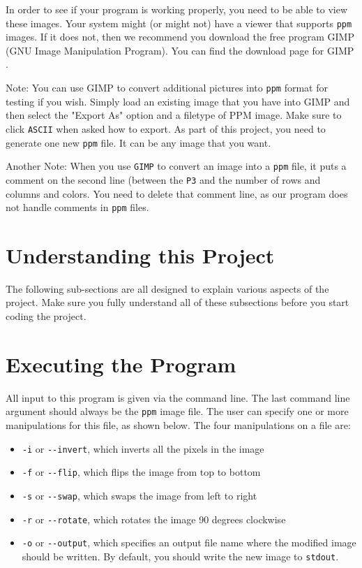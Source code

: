 \documentclass[12pt]{article}
\begin{document}
In order to see if your program is working properly,
you need to be able to view these images.  Your system might (or might not)
have a viewer that supports {\tt ppm} images.  If it does not, then we
recommend you download the free program GIMP (GNU Image Manipulation Program).
You can find the download page for GIMP 
.

Note: You can use GIMP to convert additional pictures into {\tt ppm} format
for testing if you wish.  Simply load an existing image that you have into
GIMP and then select the "Export As" option and a filetype of PPM image.  Make
sure to click {\tt ASCII} when asked how to export.  As part of this project,
you need to generate one new {\tt ppm} file.  It can be any image that you want.

Another Note:  When you use {\tt GIMP} to convert an image into
a {\tt ppm} file, it puts
a comment on the second line (between the {\tt P3} and the number of rows and
columns and colors.  You need to delete that comment line, as our program
does not handle comments in {\tt ppm} files.

\section*{Understanding this Project}

The following sub-sections are all designed to explain various aspects of
the project.  Make sure you fully understand all of these subsections before
you start coding the project.

\section*{Executing the Program}

All input to this program is given via the command line.  The last
command line argument should always be the {\tt ppm} image file.
The user can specify one or more manipulations for this file,
as shown below.  The four manipulations on a file are:
\begin{itemize}
\item {\tt -i} or {\tt -{}-invert}, which inverts all the pixels
in the image
\item {\tt -f} or {\tt -{}-flip}, which flips the image from top
to bottom
\item {\tt -s} or {\tt -{}-swap}, which swaps the image from left
to right
\item {\tt -r} or {\tt -{}-rotate}, which rotates the image
90 degrees clockwise
\item {\tt -o} or {\tt -{}-output}, which specifies an output
file name where the modified image should be written.  By
default, you should write the new image to {\tt stdout}.
\end{itemize}
\end{document}
